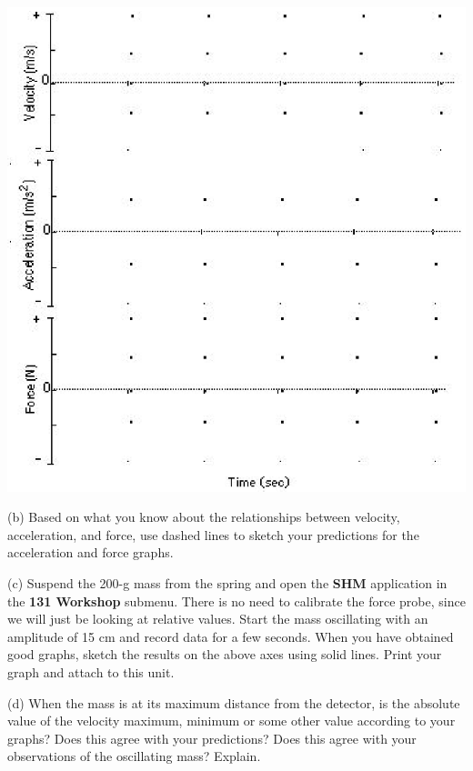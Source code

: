 \vspace{0.3cm}
{\par\centering \includegraphics{periodic_motion/periodic_motion_fig3.eps} \par}

(b) Based on what you know about the relationships between velocity, 
acceleration, and force, use dashed lines to sketch your predictions for the 
acceleration and force graphs.

(c) Suspend the 200-g mass from the spring and open the \textbf{SHM} application in the \textbf{131 Workshop} submenu. There is no need to calibrate the force probe, since we will just be looking at relative values. Start the mass oscillating with an amplitude of 15 cm and record data for a few seconds.
When you have obtained good graphs, sketch the results on the above axes using
solid lines. Print your graph and attach to this unit.

(d) When the mass is at its maximum distance from the detector, is the absolute
 value of the velocity
maximum, minimum or some other value according to your graphs? Does this agree
with your predictions? Does this agree with your observations of the oscillating
mass? Explain.
\answerspace{15mm}

